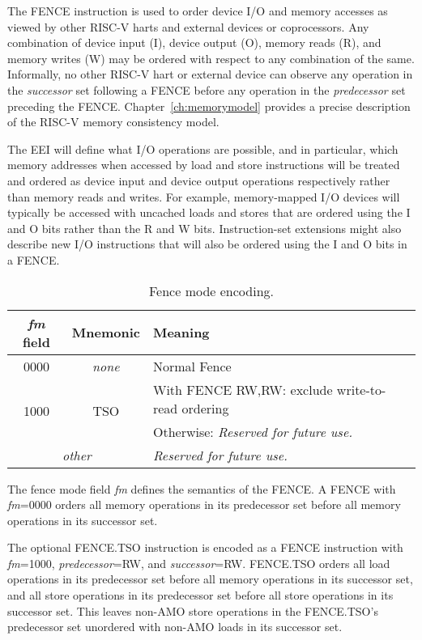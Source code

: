 The FENCE instruction is used to order device I/O and
memory accesses as viewed by other RISC-V harts and external devices
or coprocessors.  Any combination of device input (I), device output
(O), memory reads (R), and memory writes (W) may be ordered with
respect to any combination of the same.  Informally, no other RISC-V
hart or external device can observe any operation in the {\em
  successor} set following a FENCE before any operation in the {\em
  predecessor} set preceding the FENCE.
Chapter~\ref{ch:memorymodel} provides a precise description of the
RISC-V memory consistency model.
  
The EEI will define what I/O operations are possible, and in
particular, which memory addresses when accessed by load and store instructions will be treated and
ordered as device input and device output operations respectively
rather than memory reads and writes.  For example, memory-mapped I/O
devices will typically be accessed with uncached loads and stores that
are ordered using the I and O bits rather than the R and W bits.
Instruction-set extensions might also describe new I/O
instructions that will also be ordered using the I and O bits in a
FENCE.

\begin{table}[htp]
\begin{small}
\begin{center}
\begin{tabular}{|c|c|l|}
\hline
{\em fm} field & Mnemonic & Meaning \\
\hline
0000 & \em none & Normal Fence \\
\hline
\multirow{2}{*}{1000} & \multirow{2}{*}{TSO} & With FENCE RW,RW: exclude write-to-read ordering \\
                      &                      & Otherwise: \em Reserved for future use. \\
\hline
\multicolumn{2}{|c|}{\em other} & \em Reserved for future use. \\
\hline
\end{tabular}
\end{center}
\end{small}
\caption{Fence mode encoding.}
\label{fm}
\end{table}

The fence mode field {\em fm} defines the semantics of the FENCE.  A
FENCE with {\em fm}=0000 orders all memory operations in its
predecessor set before all memory operations in its successor set. 

The optional FENCE.TSO instruction is encoded as a FENCE instruction
with {\em fm}=1000, {\em predecessor}=RW, and {\em successor}=RW.
FENCE.TSO orders all load
operations in its predecessor set before all memory operations in its
successor set, and all store operations in its predecessor set before
all store operations in its successor set.  This leaves non-AMO store
operations in the FENCE.TSO's predecessor set unordered with non-AMO
loads in its successor set.

